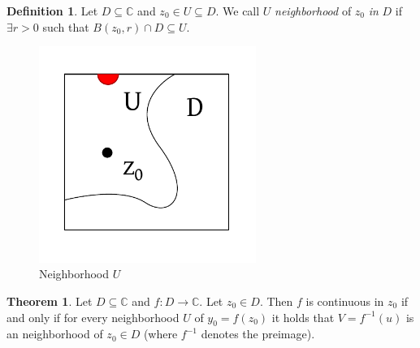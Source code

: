 \documentclass[a4paper,landscape,twocolumn]{article}
\theoremstyle{definition}
\newtheorem{theorem}{Theorem}
\newtheorem{defi}{Definition}
\begin{document}
\begin{defi}
  Let $D \subseteq \mathbb C$ and $z_0 \in U \subseteq D$.
  We call $U$ \emph{neighborhood} of $z_0$ \emph{in} $D$ if $\exists r > 0$
  such that $B(z_0, r) \cap D \subseteq U$.
\end{defi}

\begin{figure}[!h]
  \begin{center}
    \includegraphics[width=200pt]{img/environment_D_and_U.pdf}
    \caption{Neighborhood $U$}
  \end{center}
\end{figure}

\begin{theorem}
  Let $D \subseteq \mathbb C$ and $f: D \to \mathbb C$.
  Let $z_0 \in D$. Then $f$ is continuous in $z_0$
  if and only if for every neighborhood $U$ of $y_0 = f(z_0)$
  it holds that $V = f^{-1}(u)$ is an neighborhood of $z_0 \in D$
  (where $f^{-1}$ denotes the preimage).
\end{theorem}
\end{document}

